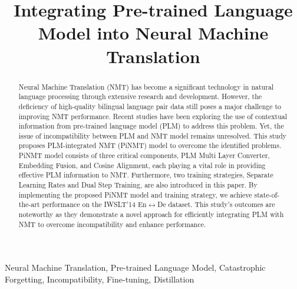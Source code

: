 \documentclass[conference]{IEEEtran}
\begin{document}
\title{Integrating Pre-trained Language Model into Neural Machine Translation}


\author{
\and
{}
}

\maketitle

\begin{abstract}
Neural Machine Translation (NMT) has become a significant technology in natural language processing through extensive research and development. However, the deficiency of high-quality bilingual language pair data still poses a major challenge to improving NMT performance. Recent studies have been exploring the use of contextual information from pre-trained language model (PLM) to address this problem. Yet, the issue of incompatibility between PLM and NMT model remains unresolved. This study proposes PLM-integrated NMT (PiNMT) model to overcome the identified problems. PiNMT model consists of three critical components, PLM Multi Layer Converter, Embedding Fusion, and Cosine Alignment, each playing a vital role in providing effective PLM information to NMT. Furthermore, two training strategies, Separate Learning Rates and Dual Step Training, are also introduced in this paper. By implementing the proposed PiNMT model and training strategy, we achieve state-of-the-art performance on the IWSLT'14 En$\leftrightarrow$De dataset. This study's outcomes are noteworthy as they demonstrate a novel approach for efficiently integrating PLM with NMT to overcome incompatibility and enhance performance.
\end{abstract}

\begin{IEEEkeywords}
Neural Machine Translation, Pre-trained Language Model, Catastrophic Forgetting, Incompatibility, Fine-tuning, Distillation 
\end{IEEEkeywords}
\end{document}
